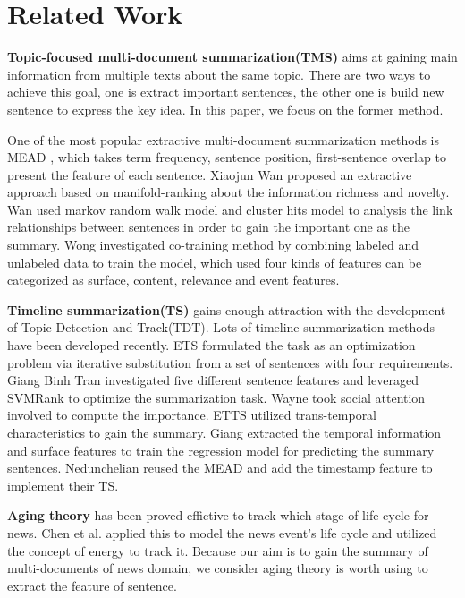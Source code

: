\documentclass{llncs}
\begin{document}
%
\section{Related Work}
%
\textbf{Topic-focused multi-document summarization(TMS)} aims at gaining main information from multiple texts about the same topic. There are two ways to achieve this goal, one is extract important sentences, the other one is build new sentence to express the key idea. In this paper, we focus on the former method.

One of the most popular extractive multi-document summarization methods is MEAD \cite{2004-Radev-p919-938}, which takes term frequency, sentence position, first-sentence overlap to present the feature of each sentence. Xiaojun Wan \cite{wan2007manifold} proposed an extractive approach based on manifold-ranking about the information richness and novelty. Wan \cite{2008-Wan-p299-306} used markov random walk model and cluster hits model to analysis the link relationships between sentences in order to gain the important one as the summary. Wong \cite{2008-Wong-p985-992} investigated co-training method by combining labeled and unlabeled data to train the model, which used four kinds of features can be categorized as surface, content, relevance and event features.

\textbf{Timeline summarization(TS)} gains enough attraction with the development of Topic Detection and Track(TDT). Lots of timeline summarization methods have been developed recently. ETS \cite{2011-Yan-p745-754} formulated the task as an optimization  problem via iterative substitution from a set of sentences with four requirements. Giang Binh Tran\cite{tran2013leveraging} investigated five different sentence features and leveraged SVMRank to optimize the summarization task. Wayne \cite{zhao2013timeline} took social attention involved to compute the importance. ETTS \cite{yan2011timeline} utilized trans-temporal characteristics to gain the summary. Giang \cite{binh2013structured} extracted the temporal information and surface features to train the regression model for predicting the summary sentences. Nedunchelian \cite{2008-Nedunchelian-p480-485} reused the MEAD and add the timestamp feature to implement their TS.
 
\textbf{Aging theory} has been proved effictive to track which stage of life cycle for news. Chen et al. \cite{2007-Chen-p1016-1025} \cite{2003-Chen-p47-59} applied this to model the news event's life cycle and utilized the concept of energy to track it. Because our aim is to gain the summary of multi-documents of news domain, we consider aging theory is worth using to extract the feature of sentence.
\end{document}
